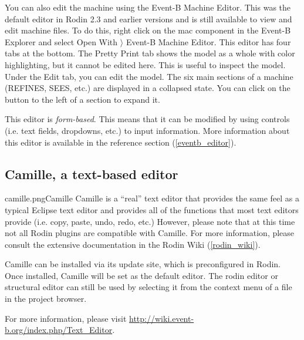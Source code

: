 You can also edit the machine using the Event-B Machine Editor. This was the default editor in Rodin 2.3 and earlier versions and is still available to view and edit machine files. To do this, right click on the \textsf{mac} component in the Event-B Explorer and select \textsf{Open With $\rangle$ Event-B Machine Editor}. This editor has four tabs at the bottom.  The \textsf{Pretty Print} tab shows the model as a whole with color highlighting, but it cannot be edited here.  This is useful to inspect the model. Under the \textsf{Edit} tab, you can edit the model.  The six main sections of a machine (REFINES, SEES, etc.) are displayed in a collapsed state.  You can click on the  button to the left of a section to expand it.


This editor is \textit{form-based}.  This means that it can be modified by using controls (i.e. text fields, dropdowns, etc.) to input information. More information about this editor is available in the reference section (\ref{eventb_editor}).


\subsection{Camille, a text-based editor}
\label{tut_camille}

\begin{rodin-plugin}{camille.png}{Camille}
Camille is a ``real'' text editor that provides the same feel as a typical Eclipse text editor and provides all of the functions that most text editors provide (i.e. copy, paste, undo, redo, etc.)  However, please note that at this time not all Rodin plugins are compatible with Camille.  For more information, please consult the extensive documentation in the Rodin Wiki (\ref{rodin_wiki}).

Camille can be installed via its update site, which is preconfigured in Rodin.  Once installed, Camille will be set as the default editor.  The rodin editor or structural editor can still be used by selecting it from the context menu of a file in the project browser.

For more information, please visit \url{http://wiki.event-b.org/index.php/Text_Editor}.


\end{rodin-plugin}

